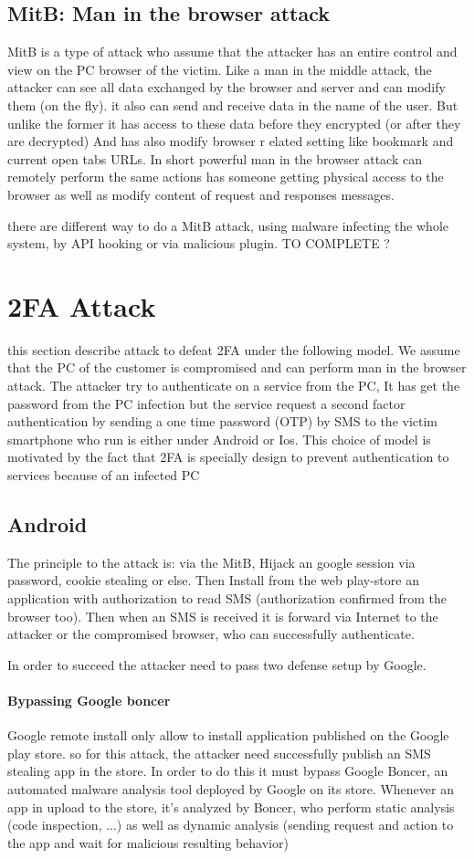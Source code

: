 \documentclass[11pt, a4paper,twocolumn]{article}
\begin{document}
\subsection{MitB: Man in the browser attack}
MitB is a type of attack who assume that the attacker has an entire control and view on the PC browser of the victim. Like a man in the middle attack, the attacker can see all data 
exchanged by the browser and server and can modify them (on the fly). it also can send and receive data in the name of the user. But unlike the former it has access to these data before they encrypted (or after they are decrypted) And has also modify browser r elated setting like bookmark and current open tabs URLs. In short powerful man in the browser attack can remotely perform the same actions has someone getting physical access to the browser as well as modify content of request and responses messages.

there are different way to do a MitB attack, using malware infecting the whole system, by API hooking or via malicious plugin. TO COMPLETE ?


\section{2FA Attack}
 this section describe attack to defeat 2FA under the following model. We assume that the PC of the customer is compromised and can perform man in the browser attack. The attacker try to authenticate on a service from the PC, It has get the password from the PC infection but the service request a second factor authentication by sending a one time password (OTP) by SMS to the victim smartphone who run is either under Android or Ios. 
This choice of model is motivated by the fact that 2FA is specially design to prevent authentication to services because of an infected PC 
\subsection{Android}
The principle to the attack is: via the MitB, Hijack an google session via password, cookie stealing or else. Then Install from the web play-store an application with authorization to read SMS (authorization confirmed from the browser too). Then when an SMS is received it is forward via Internet to the attacker or the compromised browser, who can successfully authenticate.

In order to succeed the attacker need to pass two defense setup by Google.

\paragraph{Bypassing Google boncer} Google remote install only allow to install application published on the Google play store. so for this attack, the attacker need successfully publish an SMS stealing app in the store. In order to do this it must bypass Google Boncer, an automated malware analysis tool deployed by Google on its store. Whenever an app in upload to the store, it's analyzed by Boncer, who perform static analysis (code inspection, ...) as well as dynamic analysis (sending request and action to the app and wait for malicious resulting behavior)
\end{document}
